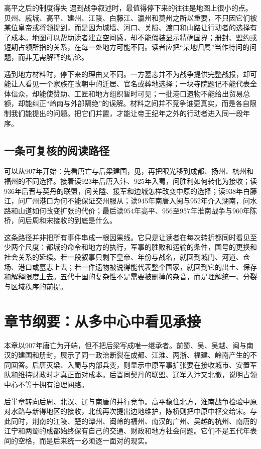 \begin{causalchain}{高平之后的制度得失}
遇到战争叙述时，最值得停下来的往往是地图上很小的点。贝州、戚城、高平、建州、江陵、白藤江、瀛州和莫州之所以重要，不只因它们被某位皇帝或将领提到，而是因为城墙、河口、关隘、渡口和山路让行动者的选择有了成本。地图可以帮助读者建立空间感，却不能假装显示精确国界；册封、盟约或短期占领所指的关系，在每一处地方可能不同。读者应把“某地归属”当作待问的问题，而非无需解释的结论。

遇到地方材料时，停下来的理由又不同。一方墓志并不为战争提供完整战报，却可能让人看见一个家族在改朝中的迁居、官名或葬地选择；一块寺院题记不能代表全体信众，却能使赞助、工匠和地方组织暂时可见；一批港口遗物不能给出贸易总额，却能纠正“岭南与外部隔绝”的误解。材料之间并不竞争谁更真实，而是各自限制我们能提出的问题。把它们并置，才能让帝王纪年之外的行动者进入同一段年序。

\subsection{一条可复核的阅读路径}

可以从907年开始：先看唐亡与后梁建国，见，再把眼光移到成都、扬州、杭州和福州的不同选择。接着读923年后唐入汴、925年入蜀，问胜利如何转化为接收；读936年后晋与契丹的联盟，问关隘、援军和边城怎样改变中原的选择；读938年白藤江，问广州港口为何不能保证交州服从；读945年南唐入闽与952年介入湖南，问水路和山道如何改变扩张的代价；最后读954年高平、956至957年淮南战争与960年陈桥，问后周和宋接收的到底是什么。

这条路径并非把所有事件串成一根因果线。它只是让读者在每次转折都同时看见至少两个尺度：都城的命令和地方的执行，军事的胜败和运输的条件，国号的更换和社会关系的延续。若一段叙事只剩下皇帝、年份与战名，就回到城门、河道、仓场、港口或墓志上去；若一件遗物被说得能代表整个国家，就回到它的出土、保存和解释限度上去。五代十国的复杂性不是需要被删掉的杂音，而是理解统一、分裂与区域秩序的前提。

\section{章节纲要：从多中心中看见承接}

本章以907年唐亡为开端，但不把后梁写成唯一继承者。前蜀、吴、吴越、闽与南汉的建国和册封，展示了同一政治断裂在成都、江淮、两浙、福建、岭南产生的不同回答。后唐灭梁、入蜀与内部兵变，则显示中原军事扩张要在接收城市、安置军队和维持财政时才真正面对成本。后晋同契丹的联盟、辽军入汴又北撤，说明占领中心不等于拥有治理网络。

后半章转向后周、北汉、辽与南唐的并行竞争。高平稳住北方，淮南战争检验中原对水路与新得地区的接收，北伐再次提出边地维护，陈桥则把中原中枢交给宋。与此同时，荆南的江陵、楚的潭州、闽岭的福州、南汉的广州、吴越的杭州、南唐的江宁和两蜀的成都始终保有自己的交通、财政和地方社会问题。它们不是五代年表间的空格，而是后来统一必须逐一面对的现实。


\end{causalchain}
